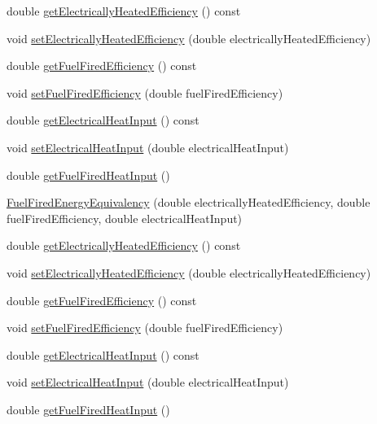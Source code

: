 \begin{DoxyCompactItemize}
\item 
double \hyperlink{class_fuel_fired_energy_equivalency_ad4bd750677313895d8345c7eaf8308bd}{get\+Electrically\+Heated\+Efficiency} () const
\item 
void \hyperlink{class_fuel_fired_energy_equivalency_a2e8e166d9824ee07805cd790eff5e361}{set\+Electrically\+Heated\+Efficiency} (double electrically\+Heated\+Efficiency)
\item 
double \hyperlink{class_fuel_fired_energy_equivalency_ac8695c1fe3dcffeab60b5305239d2a58}{get\+Fuel\+Fired\+Efficiency} () const
\item 
void \hyperlink{class_fuel_fired_energy_equivalency_a510b4a7c1231faeeebca02fa0b1723ae}{set\+Fuel\+Fired\+Efficiency} (double fuel\+Fired\+Efficiency)
\item 
double \hyperlink{class_fuel_fired_energy_equivalency_a7d5878809c01a9243aa999406cddd4a9}{get\+Electrical\+Heat\+Input} () const
\item 
void \hyperlink{class_fuel_fired_energy_equivalency_a222836bfef1cb0caec0adafc2ef6b7ea}{set\+Electrical\+Heat\+Input} (double electrical\+Heat\+Input)
\item 
double \hyperlink{class_fuel_fired_energy_equivalency_a6bf68595ca361dd4135d0c84c2fbe6d9}{get\+Fuel\+Fired\+Heat\+Input} ()
\item 
\hyperlink{class_fuel_fired_energy_equivalency_ac4ba992ccb3d4a19eb29f14898031690}{Fuel\+Fired\+Energy\+Equivalency} (double electrically\+Heated\+Efficiency, double fuel\+Fired\+Efficiency, double electrical\+Heat\+Input)
\item 
double \hyperlink{class_fuel_fired_energy_equivalency_ad4bd750677313895d8345c7eaf8308bd}{get\+Electrically\+Heated\+Efficiency} () const
\item 
void \hyperlink{class_fuel_fired_energy_equivalency_a2e8e166d9824ee07805cd790eff5e361}{set\+Electrically\+Heated\+Efficiency} (double electrically\+Heated\+Efficiency)
\item 
double \hyperlink{class_fuel_fired_energy_equivalency_ac8695c1fe3dcffeab60b5305239d2a58}{get\+Fuel\+Fired\+Efficiency} () const
\item 
void \hyperlink{class_fuel_fired_energy_equivalency_a510b4a7c1231faeeebca02fa0b1723ae}{set\+Fuel\+Fired\+Efficiency} (double fuel\+Fired\+Efficiency)
\item 
double \hyperlink{class_fuel_fired_energy_equivalency_a7d5878809c01a9243aa999406cddd4a9}{get\+Electrical\+Heat\+Input} () const
\item 
void \hyperlink{class_fuel_fired_energy_equivalency_a222836bfef1cb0caec0adafc2ef6b7ea}{set\+Electrical\+Heat\+Input} (double electrical\+Heat\+Input)
\item 
double \hyperlink{class_fuel_fired_energy_equivalency_a6bf68595ca361dd4135d0c84c2fbe6d9}{get\+Fuel\+Fired\+Heat\+Input} ()
\end{DoxyCompactItemize}


